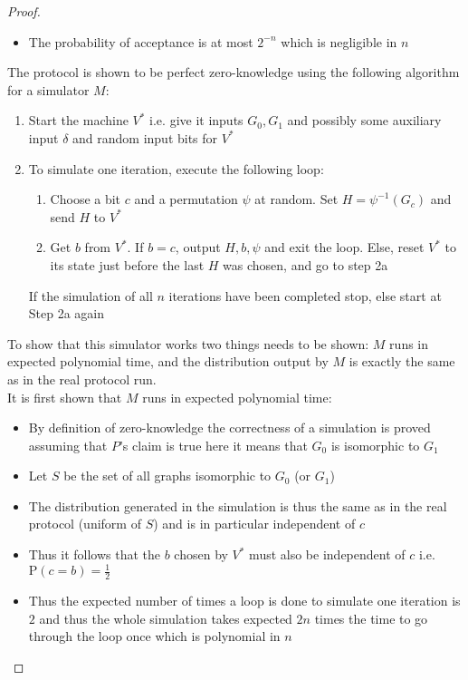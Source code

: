\begin{itemize}
\begin{proof}
\begin{itemize}
      \item The probability of acceptance is at most $2^{-n}$ which is negligible in $n$
    \end{itemize}
    The protocol is shown to be perfect zero-knowledge using the following algorithm for a simulator $M$:
    \begin{enumerate}
    	\item Start the machine $V^*$ i.e. give it inputs $G_0, G_1$ and possibly some auxiliary input $\delta$ and random input bits for $V^*$
      \item To simulate one iteration, execute the following loop:
      \begin{enumerate}
      	\item Choose a bit $c$ and a permutation $\psi$ at random. Set $H=\psi^{-1}(G_c)$ and send $H$ to $V^*$ 
        \item Get $b$ from $V^*$. If $b=c$, output $H,b,\psi$ and exit the loop. Else, reset $V^*$ to its state just before the last $H$ was chosen, and go to step 2a
      \end{enumerate}
      If the simulation of all $n$ iterations have been completed stop, else start at Step 2a again
    \end{enumerate}
    To show that this simulator works two things needs to be shown: $M$ runs in expected polynomial time, and the distribution output by $M$ is exactly the same as in the real protocol run. \\
    It is first shown that $M$ runs in expected polynomial time:
    \begin{itemize}
    	\item By definition of zero-knowledge the correctness of a simulation is proved assuming that $P$'s claim is true here it means that $G_0$ is isomorphic to $G_1$
      \item Let $S$ be the set of all graphs isomorphic to $G_0$ (or $G_1$)
      \item The distribution generated in the simulation is thus the same as in the real protocol (uniform of $S$) and is in particular independent of $c$
      \item Thus it follows that the $b$ chosen by $V^*$ must also be independent of $c$ i.e. $\text{P}(c=b) = \frac12$
      \item Thus the expected number of times a loop is done to simulate one iteration is $2$ and thus the whole simulation takes expected $2n$ times the time to go through the loop once which is polynomial in $n$
    \end{itemize}

\end{proof}
\end{itemize}

